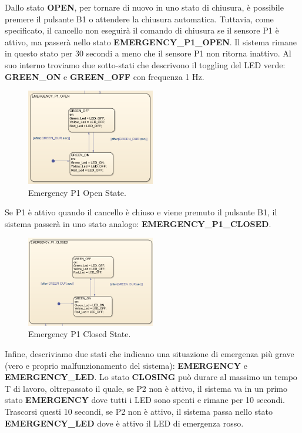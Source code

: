 \documentclass[12pt]{article}
\begin{document}
Dallo stato \textbf{OPEN}, per tornare di nuovo in uno stato di chiusura, è possibile premere il pulsante B1 o attendere la chiusura automatica. Tuttavia, come specificato, il cancello non eseguirà il comando di chiusura se il sensore P1 è attivo, ma passerà nello stato \textbf{EMERGENCY\_P1\_OPEN}. Il sistema rimane in questo stato per 30 secondi a meno che il sensore P1 non ritorna inattivo. Al suo interno troviamo due sotto-stati che descrivono il toggling del LED verde: \textbf{GREEN\_ON} e \textbf{GREEN\_OFF} con frequenza 1 Hz.
\vspace{1.5cm}
\begin{figure}[H]
    \centering
    \includegraphics[width=0.5\textwidth]{imm/Emergency_P1_Open.png}
    \caption{Emergency P1 Open State.}
\end{figure}
\vspace{1.5cm}
\noindent Se P1 è attivo quando il cancello è chiuso e viene premuto il pulsante B1, il sistema passerà in uno stato analogo: \textbf{EMERGENCY\_P1\_CLOSED}.
\vspace{1cm}
\begin{figure}[H]
    \centering
    \includegraphics[width=0.5\textwidth]{imm/Emergency_P1_Closed.png}
    \caption{Emergency P1 Closed State.}
\end{figure}

\noindent Infine, descriviamo due stati che indicano una situazione di emergenza più grave (vero e proprio malfunzionamento del sistema): \textbf{EMERGENCY} e \textbf{EMERGENCY\_LED}. Lo stato \textbf{CLOSING} può durare al massimo un tempo T di lavoro, oltrepassato il quale, se P2 non è attivo, il sistema va in un primo stato \textbf{EMERGENCY} dove tutti i LED sono spenti e rimane per 10 secondi. Trascorsi questi 10 secondi, se P2 non è attivo, il sistema passa nello stato \textbf{EMERGENCY\_LED} dove è attivo il LED di emergenza rosso.
\end{document}
